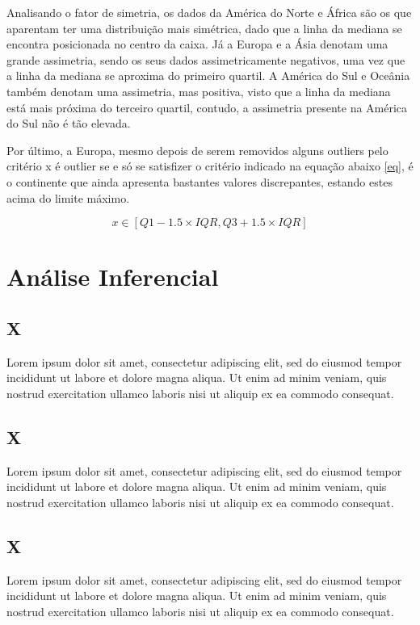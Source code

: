 \documentclass[conference]{IEEEtran}
\begin{document}
Analisando o fator de simetria, os dados da América do Norte e África são os que aparentam ter uma distribuição mais simétrica, dado que a linha da mediana se encontra posicionada no centro da caixa. Já a Europa e a Ásia denotam uma grande assimetria, sendo os seus dados assimetricamente negativos, uma vez que a linha da mediana se aproxima do primeiro quartil. A América do Sul e Oceânia também denotam uma assimetria, mas positiva, visto que a linha da mediana está mais próxima do terceiro quartil, contudo, a assimetria presente na América do Sul não é tão elevada.

Por último, a Europa, mesmo depois de serem removidos alguns outliers pelo critério x é outlier se e só se satisfizer o critério indicado na equação abaixo \eqref{eq}, é o continente que ainda apresenta bastantes valores discrepantes, estando estes acima do limite máximo.

\begin{equation}
x\in [Q1-1.5\times IQR, Q3+1.5\times IQR]\label{eq}
\end{equation}



\section{Análise Inferencial} %

\subsection{X}
Lorem ipsum dolor sit amet, consectetur adipiscing elit, sed do eiusmod tempor incididunt ut labore et dolore magna aliqua. Ut enim ad minim veniam, quis nostrud exercitation ullamco laboris nisi ut aliquip ex ea commodo consequat.

\subsection{X}
Lorem ipsum dolor sit amet, consectetur adipiscing elit, sed do eiusmod tempor incididunt ut labore et dolore magna aliqua. Ut enim ad minim veniam, quis nostrud exercitation ullamco laboris nisi ut aliquip ex ea commodo consequat.

\subsection{X}
Lorem ipsum dolor sit amet, consectetur adipiscing elit, sed do eiusmod tempor incididunt ut labore et dolore magna aliqua. Ut enim ad minim veniam, quis nostrud exercitation ullamco laboris nisi ut aliquip ex ea commodo consequat.
\end{document}
